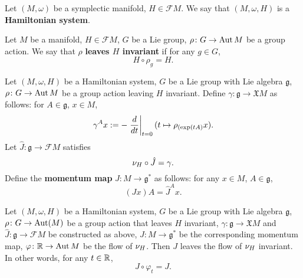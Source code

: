\begin{definition}
  Let $(M, \omega)$ be a symplectic manifold, $H \in \mathcal{F} M$.
  We say that $(M, \omega, H)$ is a \textbf{Hamiltonian system}. 
\end{definition}
\begin{definition}
  Let
    $M$ be a manifold,
    $H \in \mathcal{F} M$,
    $G$ be a Lie group,
    $\rho \colon G \to \mathop{\rm Aut}\nolimits M$ be a group action.
  We say that $\rho$ \textbf{leaves $H$ invariant} if for any $g \in G$,
  \begin{equation}
    H \circ \rho_g = H.
  \end{equation}
\end{definition}
\begin{definition}
  Let
    $(M, \omega, H)$ be a Hamiltonian system,
    $G$ be a Lie group with Lie algebra $\mathfrak{g}$,
    $\rho \colon G \to \mathop{\rm Aut}\nolimits M$ be a group action leaving $H$ invariant.
  Define $\gamma \colon \mathfrak{g} \to \mathfrak{X} M$ as follows:
  for $A \in \mathfrak{g}$, $x \in M$,
  \begin{equation}
    \gamma^A x
    := - \left. \frac{d}{d t} \right|_{t = 0}(t \mapsto \rho_{(\exp(t A)} x).
  \end{equation}
  Let $\hat{J} \colon \mathfrak{g} \to \mathcal{F} M$ satisfies
  \begin{equation}
    \nu_H \circ \hat{J} = \gamma.
  \end{equation}
  Define the \textbf{momentum map} $J \colon M \to \mathfrak{g}^*$ as follows:
  for any $x \in M$, $A \in \mathfrak{g}$,
  \begin{equation}
    (J x) A = \hat{J}^A x.
  \end{equation}
\end{definition}
\begin{theorem}[Noether]
  Let
    $(M, \omega, H)$ be a Hamiltonian system,
    $G$ be a Lie group with Lie algebra $\mathfrak{g}$,
    $\rho \colon G \to \mathop{\rm Aut}\nolimits(M)$ be a group action that leaves $H$ invariant,
    $\gamma \colon \mathfrak{g} \to \mathfrak{X} M$ and
    $\hat{J} \colon \mathfrak{g} \to \mathcal{F} M$ be constructed as above,
    $J \colon M \to \mathfrak{g}^*$ be the corresponding momentum map,
    $\varphi \colon \mathbb{R} \to \mathop{\rm Aut}\nolimits M$ be the flow of $\nu_H$.
  Then $J$ leaves the flow of $\nu_H$ invariant.
  In other words, for any $t \in \mathbb{R}$,
  \begin{equation}
    J \circ \varphi_t = J.
  \end{equation}
\end{theorem}
